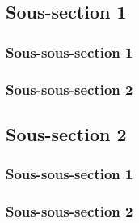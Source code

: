
\subsection{Sous-section 1}
    \subsubsection{Sous-sous-section 1}


    \subsubsection{Sous-sous-section 2}

    
    \subsection{Sous-section 2}
        \subsubsection{Sous-sous-section 1}


        \subsubsection{Sous-sous-section 2}